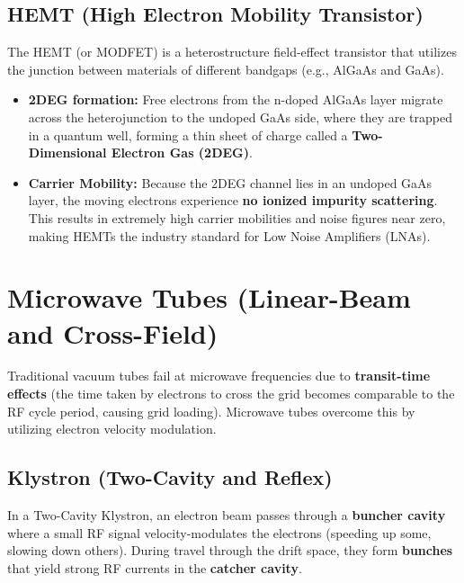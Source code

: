 \documentclass[12pt,a4paper]{article}
\begin{document}
\subsection{HEMT (High Electron Mobility Transistor)}
The HEMT (or MODFET) is a heterostructure field-effect transistor that utilizes the junction between materials of different bandgaps (e.g., AlGaAs and GaAs).
\begin{itemize}[leftmargin=*, itemsep=3pt]
  \item \textbf{2DEG formation:} Free electrons from the n-doped AlGaAs layer migrate across the heterojunction to the undoped GaAs side, where they are trapped in a quantum well, forming a thin sheet of charge called a \textbf{Two-Dimensional Electron Gas (2DEG)}.
  \item \textbf{Carrier Mobility:} Because the 2DEG channel lies in an undoped GaAs layer, the moving electrons experience \textbf{no ionized impurity scattering}. This results in extremely high carrier mobilities and noise figures near zero, making HEMTs the industry standard for Low Noise Amplifiers (LNAs).
\end{itemize}

\section{Microwave Tubes (Linear-Beam and Cross-Field)}

Traditional vacuum tubes fail at microwave frequencies due to \textbf{transit-time effects} (the time taken by electrons to cross the grid becomes comparable to the RF cycle period, causing grid loading). Microwave tubes overcome this by utilizing electron velocity modulation.

\subsection{Klystron (Two-Cavity and Reflex)}
In a Two-Cavity Klystron, an electron beam passes through a \textbf{buncher cavity} where a small RF signal velocity-modulates the electrons (speeding up some, slowing down others). During travel through the drift space, they form \textbf{bunches} that yield strong RF currents in the \textbf{catcher cavity}.
\end{document}
